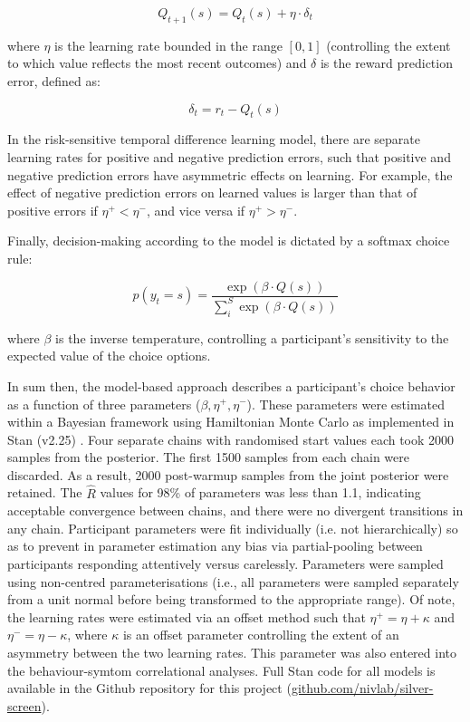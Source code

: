 \documentclass[a4paper,notitlepage,12pt]{article}
\begin{document}
\begin{equation*}
    Q_{t+1}(s) = Q_{t}(s) + \eta \cdot \delta_{t}
\end{equation*}

where $\eta$ is the learning rate bounded in the range $[0,1]$ (controlling the extent to which value reflects the most recent outcomes) and $\delta$ is the reward prediction error, defined as:

\begin{equation*}
    \delta_t = r_t - Q_{t}(s)
\end{equation*}

In the risk-sensitive temporal difference learning model, there are separate learning rates for positive and negative prediction errors, such that positive and negative prediction errors have asymmetric effects on learning. For example, the effect of negative prediction errors on learned values is larger than that of positive errors if $\eta^+ < \eta^-$, and vice versa if $\eta^+ > \eta^-$.

Finally, decision-making according to the model is dictated by a softmax choice rule:

\begin{equation*}
    p(y_t = s) = \frac{\exp \left( \beta \cdot Q(s) \right)}{\sum_i^S \exp \left( \beta \cdot Q(s) \right)}
\end{equation*}

where $\beta$ is the inverse temperature, controlling a participant's sensitivity to the expected value of the choice options.

In sum then, the model-based approach describes a participant's choice behavior as a function of three parameters ($\beta, \eta^+, \eta^-$). These parameters were estimated within a Bayesian framework using Hamiltonian Monte Carlo as implemented in Stan (v2.25) \cite{stan}. Four separate chains with randomised start values each took 2000 samples from the posterior. The first 1500 samples from each chain were discarded. As a result, 2000 post-warmup samples from the joint posterior were retained. The $\hat{R}$ values for 98\% of parameters was less than 1.1, indicating acceptable convergence between chains, and there were no divergent transitions in any chain. Participant parameters were fit individually (i.e. not hierarchically) so as to prevent in parameter estimation any bias via partial-pooling between participants responding attentively versus carelessly. Parameters were sampled using non-centred parameterisations (i.e., all parameters were sampled separately from a unit normal before being transformed to the appropriate range). Of note, the learning rates were estimated via an offset method such that $\eta^+ = \eta + \kappa$ and $\eta^- = \eta - \kappa$, where $\kappa$ is an offset parameter controlling the extent of an asymmetry between the two learning rates. This parameter was also entered into the behaviour-symtom correlational analyses. Full Stan code for all models is available in the Github repository for this project (\url{github.com/nivlab/silver-screen}).
\end{document}
